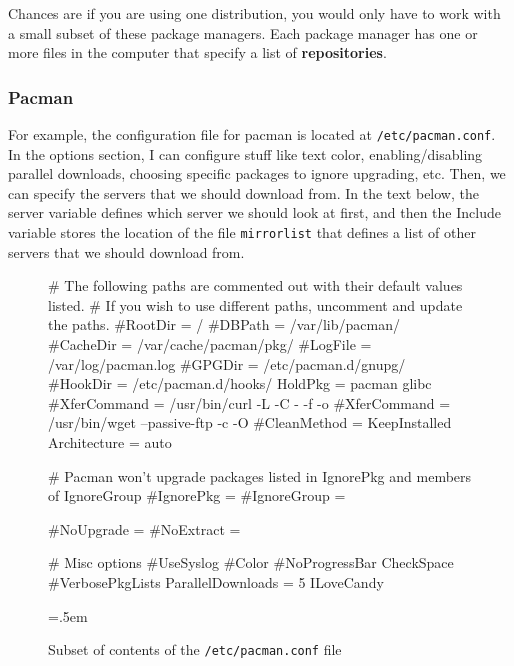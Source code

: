 \documentclass{article}
\theoremstyle{definition}
\newenvironment{cverbatim}
    {\SaveVerbatim{cverb}}
    {\endSaveVerbatim
    \flushleft\fboxrule=0pt\fboxsep=.5em
    \colorbox{cverbbg}{%
      \makebox[\dimexpr\linewidth-2\fboxsep][l]{\BUseVerbatim{cverb}}%
    }
    \endflushleft
  }
\begin{document}
    Chances are if you are using one distribution, you would only have to work with a small subset of these package managers. Each package manager has one or more files in the computer that specify a list of \textbf{repositories}. 

    \subsubsection{Pacman}

      For example, the configuration file for pacman is located at \texttt{/etc/pacman.conf}. In the options section, I can configure stuff like text color, enabling/disabling parallel downloads, choosing specific packages to ignore upgrading, etc. Then, we can specify the servers that we should download from. In the text below, the server variable defines which server we should look at first, and then the Include variable stores the location of the file \texttt{mirrorlist} that defines a list of other servers that we should download from. 
      
      \begin{figure}
        \begin{cverbatim} 
          # The following paths are commented out with their default values listed.
          # If you wish to use different paths, uncomment and update the paths.
          #RootDir     = /
          #DBPath      = /var/lib/pacman/
          #CacheDir    = /var/cache/pacman/pkg/
          #LogFile     = /var/log/pacman.log
          #GPGDir      = /etc/pacman.d/gnupg/
          #HookDir     = /etc/pacman.d/hooks/
          HoldPkg     = pacman glibc
          #XferCommand = /usr/bin/curl -L -C - -f -o %
          #XferCommand = /usr/bin/wget --passive-ftp -c -O %
          #CleanMethod = KeepInstalled
          Architecture = auto

          # Pacman won't upgrade packages listed in IgnorePkg and members of IgnoreGroup
          #IgnorePkg   =
          #IgnoreGroup =

          #NoUpgrade   =
          #NoExtract   =

          # Misc options
          #UseSyslog
          #Color
          #NoProgressBar
          CheckSpace
          #VerbosePkgLists
          ParallelDownloads = 5
          ILoveCandy

        \end{cverbatim}
        \caption{Subset of contents of the \texttt{/etc/pacman.conf} file} \label{fig:pacman.conf}
      \end{figure}
      
\end{document}

